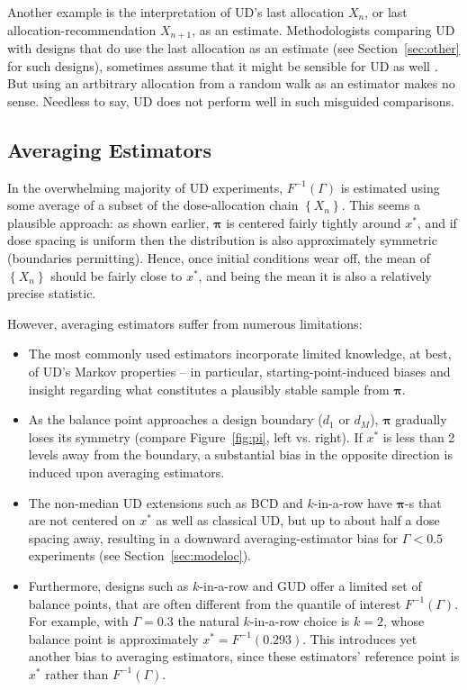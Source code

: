 Another example is the interpretation of UD's last allocation $X_n$, or last allocation-recommendation $X_{n+1}$, as an estimate.  Methodologists comparing UD with designs that do use the last allocation as an estimate (see Section~\ref{sec:other} for such designs), sometimes assume that it might be sensible for UD as well \citep{O'Qu:Chev:meth:1991,Zack:stag:2009}. But using an artbitrary allocation from a random walk as an estimator makes no sense. Needless to say, UD does not perform well in such misguided comparisons.

\subsection{Averaging Estimators}\label{sec:averaging}

In the overwhelming majority of UD experiments, $F^{-1}(\Gamma)$ is estimated using some average of a subset of the dose-allocation chain $\left\{X_n\right\}$. This seems a plausible approach: as shown earlier, $\boldsymbol{\pi}$ is centered fairly tightly around $x^*$, and if dose spacing is uniform then the distribution is also approximately symmetric (boundaries permitting). Hence, once initial conditions wear off, the mean of $\left\{X_n\right\}$ should be fairly close to $x^*$, and being the mean it is also a relatively precise statistic.

However, averaging estimators suffer from numerous limitations:

\begin{itemize}
\item The most commonly used estimators incorporate limited knowledge, at best, of UD's Markov properties -- in particular, starting-point-induced biases and insight regarding what constitutes a plausibly stable sample from $\boldsymbol{\pi}$.
\item As the balance point  approaches a design boundary ($d_1$ or $d_M$), $\boldsymbol{\pi}$ gradually loses its symmetry (compare Figure~\ref{fig:pi}, left vs. right).  If  $x^*$ is less than 2 levels away from the boundary, a substantial bias in the opposite direction is induced upon averaging estimators.
\item The non-median UD extensions such as BCD and $k$-in-a-row have $\boldsymbol{\pi}$-s that are not centered on $x^*$ as well as classical UD, but up to about half a dose spacing away, resulting in a downward averaging-estimator bias for $\Gamma<0.5$ experiments (see Section~\ref{sec:modeloc}).
\item Furthermore, designs such as $k$-in-a-row and GUD offer a limited set of balance points, that are often different from the quantile of interest $F^{-1}(\Gamma)$. For example, with $\Gamma=0.3$ the natural $k$-in-a-row choice is $k=2$, whose balance point is approximately $x^*=F^{-1}(0.293)$. This introduces yet another bias to averaging estimators, since these estimators' reference point is $x^*$ rather than $F^{-1}(\Gamma)$.
\end{itemize}

